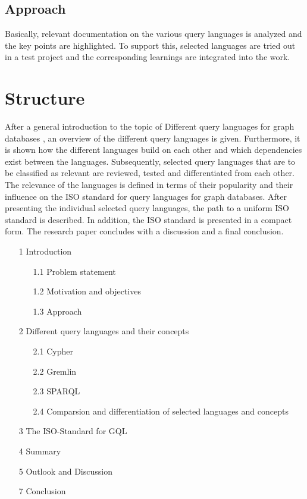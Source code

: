 \section{Approach}
\label{sec:intro:Approach}
Basically, relevant documentation on the various query languages is analyzed and the key points are highlighted. 
To support this, selected languages are tried out in a test project and the corresponding learnings are integrated into the work.



\chapter{Structure}
\label{sec:intro:Structure}
After a general introduction to the topic of \glqq Different query languages for graph databases \grqq{}, 
an overview of the different query languages is given. 
Furthermore, it is shown how the different languages build on each other and which dependencies exist between the languages.
Subsequently, selected query languages that are to be classified as relevant are reviewed, 
tested and differentiated from each other.
The relevance of the languages is defined in terms of their popularity and their influence on the ISO standard for query languages for graph databases.
After presenting the individual selected query languages, the path to a uniform ISO standard is described. 
In addition, the ISO standard is presented in a compact form.
The research paper concludes with a discussion and a final conclusion.

\begin{itemize}
	\item[1] Introduction
	\begin{itemize}
		\item[1.1] Problem statement
		\item[1.2] Motivation and objectives
		\item[1.3] Approach
	\end{itemize}
	\item[2] Different query languages and their concepts
	\begin{itemize}
		\item[2.1] Cypher
		\item[2.2] Gremlin
		\item[2.3] SPARQL
		\item[2.4] Comparsion and differentiation of selected languages and concepts 
	\end{itemize}
	\item[3] The ISO-Standard for GQL
	\item[4] Summary
	\item[5] Outlook and Discussion
	\item[7] Conclusion
\end{itemize}


